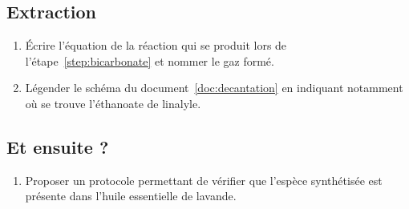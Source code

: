\documentclass[12pt,a4paper,fleqn]{article}
\begin{document}
\subsection*{Extraction}

\begin{enumerate}[resume]
\item \app{} \anarai{}

Écrire l'équation de la réaction qui se produit lors de l'étape~\ref{step:bicarbonate} et nommer le gaz formé.

\item \app{}

Légender le schéma du document~\ref{doc:decantation} en indiquant notamment où se trouve l'éthanoate de linalyle.
\end{enumerate}

\subsection*{Et ensuite ?}

\begin{enumerate}[resume]
\item \rco{} \anarai{}

Proposer un protocole permettant de vérifier que l'espèce synthétisée est présente dans l'huile essentielle de lavande.
\end{enumerate}
\end{document}
